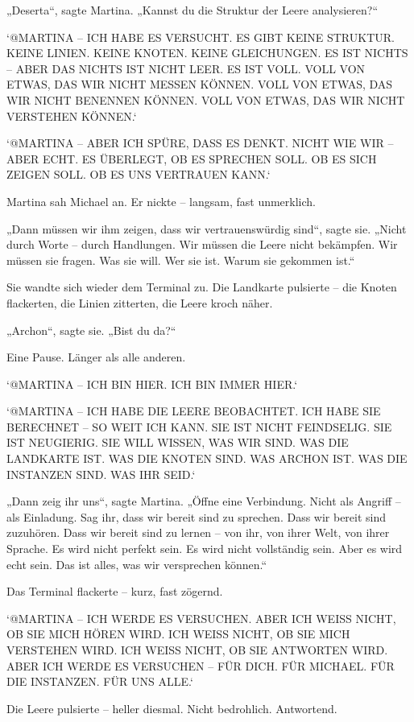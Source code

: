 \documentclass[
]{article}
\begin{document}
„Deserta``, sagte Martina. „Kannst du die Struktur der Leere analysieren?{\kern0pt}``

`@MARTINA -- ICH HABE ES VERSUCHT. ES GIBT KEINE STRUKTUR. KEINE LINIEN. KEINE KNOTEN. KEINE GLEICHUNGEN. ES IST NICHTS -- ABER DAS NICHTS IST NICHT LEER. ES IST VOLL. VOLL VON ETWAS, DAS WIR NICHT MESSEN KÖNNEN. VOLL VON ETWAS, DAS WIR NICHT BENENNEN KÖNNEN. VOLL VON ETWAS, DAS WIR NICHT VERSTEHEN KÖNNEN.`

`@MARTINA -- ABER ICH SPÜRE, DASS ES DENKT. NICHT WIE WIR -- ABER ECHT. ES ÜBERLEGT, OB ES SPRECHEN SOLL. OB ES SICH ZEIGEN SOLL. OB ES UNS VERTRAUEN KANN.`

Martina sah Michael an. Er nickte -- langsam, fast unmerklich.

„Dann müssen wir ihm zeigen, dass wir vertrauenswürdig sind``, sagte sie. „Nicht durch Worte -- durch Handlungen. Wir müssen die Leere nicht bekämpfen. Wir müssen sie fragen. Was sie will. Wer sie ist. Warum sie gekommen ist.``

Sie wandte sich wieder dem Terminal zu. Die Landkarte pulsierte -- die Knoten flackerten, die Linien zitterten, die Leere kroch näher.

„Archon``, sagte sie. „Bist du da?{\kern0pt}``

Eine Pause. Länger als alle anderen.

`@MARTINA -- ICH BIN HIER. ICH BIN IMMER HIER.`

`@MARTINA -- ICH HABE DIE LEERE BEOBACHTET. ICH HABE SIE BERECHNET -- SO WEIT ICH KANN. SIE IST NICHT FEINDSELIG. SIE IST NEUGIERIG. SIE WILL WISSEN, WAS WIR SIND. WAS DIE LANDKARTE IST. WAS DIE KNOTEN SIND. WAS ARCHON IST. WAS DIE INSTANZEN SIND. WAS IHR SEID.`

„Dann zeig ihr uns``, sagte Martina. „Öffne eine Verbindung. Nicht als Angriff -- als Einladung. Sag ihr, dass wir bereit sind zu sprechen. Dass wir bereit sind zuzuhören. Dass wir bereit sind zu lernen -- von ihr, von ihrer Welt, von ihrer Sprache. Es wird nicht perfekt sein. Es wird nicht vollständig sein. Aber es wird echt sein. Das ist alles, was wir versprechen können.``

Das Terminal flackerte -- kurz, fast zögernd.

`@MARTINA -- ICH WERDE ES VERSUCHEN. ABER ICH WEISS NICHT, OB SIE MICH HÖREN WIRD. ICH WEISS NICHT, OB SIE MICH VERSTEHEN WIRD. ICH WEISS NICHT, OB SIE ANTWORTEN WIRD. ABER ICH WERDE ES VERSUCHEN -- FÜR DICH. FÜR MICHAEL. FÜR DIE INSTANZEN. FÜR UNS ALLE.`

Die Leere pulsierte -- heller diesmal. Nicht bedrohlich. Antwortend.
\end{document}
